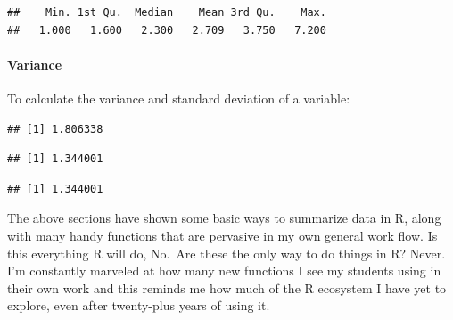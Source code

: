 \documentclass[
]{article}
\newenvironment{Shaded}{\begin{snugshade}}{\end{snugshade}}
\newcommand{\AttributeTok}[1]{\textcolor[rgb]{0.77,0.63,0.00}{#1}}
\newcommand{\CommentTok}[1]{\textcolor[rgb]{0.56,0.35,0.01}{\textit{#1}}}
\newcommand{\ConstantTok}[1]{\textcolor[rgb]{0.00,0.00,0.00}{#1}}
\newcommand{\FunctionTok}[1]{\textcolor[rgb]{0.00,0.00,0.00}{#1}}
\newcommand{\NormalTok}[1]{#1}
\newcommand{\SpecialCharTok}[1]{\textcolor[rgb]{0.00,0.00,0.00}{#1}}
\begin{document}
\begin{verbatim}
##    Min. 1st Qu.  Median    Mean 3rd Qu.    Max. 
##   1.000   1.600   2.300   2.709   3.750   7.200
\end{verbatim}

\hypertarget{variance}{%
\paragraph{Variance}\label{variance}}

To calculate the variance and standard deviation of a variable:

\begin{Shaded}
\end{Shaded}

\begin{verbatim}
## [1] 1.806338
\end{verbatim}

\begin{Shaded}
\end{Shaded}

\begin{verbatim}
## [1] 1.344001
\end{verbatim}

\begin{Shaded}
\end{Shaded}

\begin{verbatim}
## [1] 1.344001
\end{verbatim}

The above sections have shown some basic ways to summarize data in R,
along with many handy functions that are pervasive in my own general
work flow. Is this everything R will do, No.~Are these the only way to
do things in R? Never. I'm constantly marveled at how many new functions
I see my students using in their own work and this reminds me how much
of the R ecosystem I have yet to explore, even after twenty-plus years
of using it.
\end{document}
